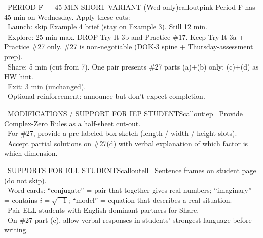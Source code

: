 \documentclass[11pt]{article}
\begin{document}
\clearpage

\begin{callout}{\IconClock\ PERIOD F --- 45-MIN SHORT VARIANT (Wed only)}{calloutpink}
Period F has 45 min on Wednesday. Apply these cuts:\\
\textbullet\ Launch: skip Example 4 brief (stay on Example 3). Still 12 min.\\
\textbullet\ Explore: 25 min max. DROP Try-It 3b and Practice \#17. Keep Try-It 3a + Practice \#27 only. \#27 is non-negotiable (DOK-3 spine + Thursday-assessment prep).\\
\textbullet\ Share: 5 min (cut from 7). One pair presents \#27 parts (a)+(b) only; (c)+(d) as HW hint.\\
\textbullet\ Exit: 3 min (unchanged).\\
\textbullet\ Optional reinforcement: announce but don't expect completion.
\end{callout}

\begin{callout}{\IconPuzzle\ MODIFICATIONS / SUPPORT FOR IEP STUDENTS}{calloutiep}
\textbullet\ Provide Complex-Zero Rules as a half-sheet cut-out.\\
\textbullet\ For \#27, provide a pre-labeled box sketch (length / width / height slots).\\
\textbullet\ Accept partial solutions on \#27(d) with verbal explanation of which factor is which dimension.
\end{callout}

\begin{callout}{\IconGlobe\ SUPPORTS FOR ELL STUDENTS}{calloutell}
\textbullet\ Sentence frames on student page (do not skip).\\
\textbullet\ Word cards: ``conjugate'' = pair that together gives real numbers; ``imaginary'' = contains \(i = \sqrt{-1}\); ``model'' = equation that describes a real situation.\\
\textbullet\ Pair ELL students with English-dominant partners for Share.\\
\textbullet\ On \#27 part (c), allow verbal responses in students' strongest language before writing.
\end{callout}
\end{document}
